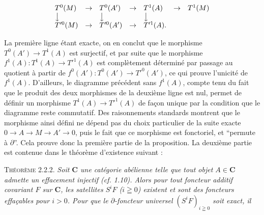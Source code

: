 \[
\begin{array}{lclclcl}
T^0(M)&\to&T^0(A')&\to&T^1(A)&\to&T^1(M)\\
\big\downarrow&&\big\downarrow&&\big\downarrow&&\\
T'^0(M)&\to&T'^0(A')&\to&T'^1(A).&&
\end{array}
\]

\noindent La première ligne étant exacte, on en conclut que le morphisme
$T^0(A')\to T^1(A)$ est surjectif, et par suite que le morphisme
$f^1(A):T^1(A)\to T'^1(A)$ est complètement déterminé par passage
au quotient à partir de
$f^0(A'):T^0(A')\to T'^0(A')$, ce qui prouve l'unicité de
$f^1(A)$. D'ailleurs, le diagramme précédent sans $f^1(A)$, compte tenu du
fait que le produit des deux morphismes de la deuxième ligne est nul, permet
de définir un morphisme $T^1(A)\to T'^1(A)$ de façon unique par la
condition que le diagramme reste commutatif. Des raisonnements standards
montrent que le morphisme ainsi défini ne dépend pas du choix particulier de
la suite exacte
$0\to A\to M\to A'\to 0$,
puis le fait que ce morphisme est fonctoriel, et
\textquotedblleft permute à $\partial$\textquotedblright. Cela prouve donc la
première partie de la proposition. La deuxième partie est contenue dans le
théorème d'existence suivant :

\indent\textsc{Théorème 2.2.2.} \textit{Soit $\mathbf{C}$ une catégorie
abélienne telle que tout objet $A\in \mathbf{C}$ admette un effacement injectif
\textup{(}\textit{cf.}\textup{ 1.10)}. Alors pour tout foncteur additif covariant $F$ sur $\mathbf{C}$, les
satellites $S^iF$ ($i\geqq0$) existent et sont des foncteurs effaçables pour
$i>0$. Pour que le $\partial$-foncteur universel $(S^iF)_{i\geqq0}$ soit exact,
il}

